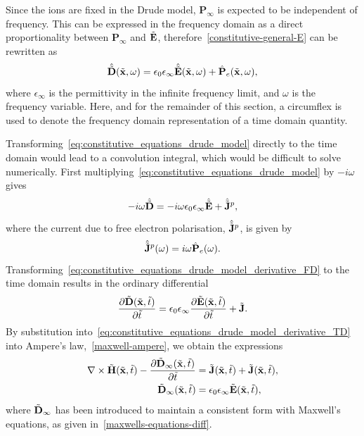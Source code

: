 Since the ions are fixed in the Drude model, $\mathbf{P}_{\infty}$ is expected to be independent of frequency. This can be expressed in the frequency domain as a direct proportionality between $\mathbf{P}_{\infty}$ and $\tilde{\mathbf{E}}$, therefore~\eqref{constitutive-general-E} can be rewritten as
%
\begin{equation}
\label{eq:constitutive_equations_drude_model}
\hat{\tilde{\mathbf{D}}}(\tilde{\mathbf{x}},\omega) = \epsilon_0 \epsilon_{\infty}  \hat{\tilde{\mathbf{E}}}(\tilde{\mathbf{x}}, \omega) + \hat{\mathbf{P}}_e(\tilde{\mathbf{x}},\omega) ,
\end{equation}
%
where $\epsilon_{\infty}$ is the permittivity in the infinite frequency limit, and $\omega$ is the frequency variable. Here, and for the remainder of this section, a circumflex is used to denote the frequency domain representation of a time domain quantity.

Transforming~\eqref{eq:constitutive_equations_drude_model} directly to the time domain would lead to a convolution integral, which would be difficult to solve numerically. First multiplying~\eqref{eq:constitutive_equations_drude_model} by $ -i \omega$ gives
\begin{equation}
\label{eq:constitutive_equations_drude_model_derivative_FD}
- i \omega \hat{\tilde{\mathbf{D}}} = -i \omega \epsilon_0 \epsilon_{\infty} \hat{\tilde{\mathbf{E}}} + \hat{\tilde{\mathbf{J}}}^p,
\end{equation}
where the current due to free electron polarisation, $\hat{\tilde{\mathbf{J}}}^p$, is given by
\begin{equation}
\label{eq:drude-free-elect-current-defn}
\hat{\tilde{\mathbf{J}}}^p(\omega) = i \omega \hat{\mathbf{P}}_e(\omega) .
\end{equation}
Transforming~\eqref{eq:constitutive_equations_drude_model_derivative_FD} to the time domain results in the ordinary differential
\begin{equation}
\label{eq:constitutive_equations_drude_model_derivative_TD}
\frac{\partial \tilde{\mathbf{D}} (\tilde{\mathbf{x}},\tilde{t}) }{\partial \tilde{t}}= \epsilon_0 \epsilon_{\infty} \frac{\partial \tilde{\mathbf{E}} (\tilde{\mathbf{x}}, \tilde{t}) }{\partial \tilde{t}} + \tilde{\mathbf{J}} .
\end{equation}
By substitution into~\eqref{eq:constitutive_equations_drude_model_derivative_TD} into Ampere's law,~\eqref{maxwell-ampere}, we obtain the expressions
\begin{subequations}
\label{eq:drude-ampere}
    \begin{align}
        \nabla \times \tilde{\mathbf{H}}(\tilde{\mathbf{x}},\tilde{t}) - \frac{\partial\tilde{\mathbf{D}}_{\infty}(\tilde{\mathbf{x}}, \tilde{t})}{\partial \tilde{t}} &= \tilde{\mathbf{J}}(\tilde{\mathbf{x}},\tilde{t}) + \tilde{\mathbf{J}}(\tilde{\mathbf{x}},\tilde{t}) , \\
        \tilde{\mathbf{D}}_{\infty}(\tilde{\mathbf{x}}, \tilde{t}) &= \epsilon_0 \epsilon_{\infty} \tilde{\mathbf{E}}(\tilde{\mathbf{x}}, \tilde{t}),
    \end{align}
\end{subequations}
where $\tilde{\mathbf{D}}_{\infty}$ has been introduced to maintain a consistent form with Maxwell's equations, as given in~\eqref{maxwells-equations-diff}.

